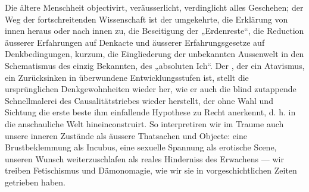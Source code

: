 Die ältere Menschheit objectivirt, veräusserlicht, verdinglicht alles Geschehen; der Weg der fortschreitenden Wissenschaft ist der umgekehrte, die Erklärung von innen heraus oder nach innen zu, die Beseitigung der „Erdenreste“, die Reduction äusserer Erfahrungen auf Denkacte und äusserer Erfahrungsgesetze auf Denkbedingungen, kurzum, die Eingliederung der unbekannten Aussenwelt in den Schematismus des einzig Bekannten, des „absoluten Ich“. Der , der ein Atavismus, ein Zurücksinken in überwundene Entwicklungsstufen ist, stellt die ursprünglichen Denkgewohnheiten wieder her, wie er auch die blind zutappende Schnellmalerei des Causalitätstriebes wieder herstellt, der ohne Wahl und Sichtung die erste beste ihm einfallende Hypothese zu Recht anerkennt, d. h. in die anschauliche Welt hineinconstruirt. So interpretiren wir im Traume auch unsere inneren Zustände als äussere Thatsachen und Objecte: eine Brustbeklemmung als Incubus, eine sexuelle Spannung als erotische Scene, unseren Wunsch weiterzuschlafen als reales Hinderniss des Erwachens — wir treiben Fetischismus und Dämonomagie, wie wir sie in vorgeschichtlichen Zeiten getrieben haben.
\par

